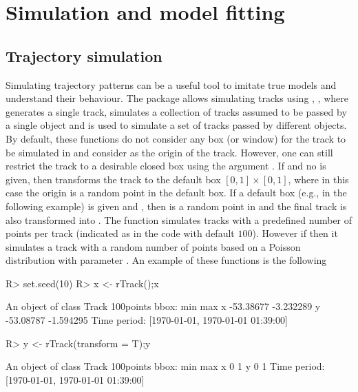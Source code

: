 \documentclass[article]{jss}
\begin{document}
\section{Simulation and model fitting}\label{simandfitt}
  \subsection{Trajectory simulation}
  Simulating trajectory patterns can be a useful tool to imitate true models and understand their behaviour. The package  allows simulating tracks using , ,  where  generates a single track,  simulates a collection of tracks assumed to be passed by a single object and  is used to simulate a set of tracks passed by different objects. By default, these functions do not consider any box (or window) for the track to be simulated in and consider  as the origin of the track. However, one can still restrict the track to a desirable closed box using the argument . If  and no  is given, then  transforms the track to the default box $[0,1]\times [0,1]$, where in this case the origin is a random point in the default box. If a default box  (e.g.,  in the following example) is given and , then  is a random point in  and the final track is also transformed into . The function  simulates tracks with a predefined number of points per track (indicated as  in the code with default $100$). However if  then it simulates a track with a random number of points based on a Poisson distribution with parameter . An example of these functions is the following
\begin{Sinput}
R> set.seed(10)
R> x <- rTrack();x
\end{Sinput}
\begin{Soutput}
An object of class Track 
100points 
bbox: 
        min       max
x -53.38677 -3.232289
y -53.08787 -1.594295
Time period: [1970-01-01, 1970-01-01 01:39:00]
\end{Soutput}
\begin{Sinput}
R> y <- rTrack(transform = T);y
\end{Sinput}
\begin{Soutput}
An object of class Track 
100points 
bbox: 
  min max
x   0   1
y   0   1
Time period: [1970-01-01, 1970-01-01 01:39:00]
\end{Soutput}
\end{document}
